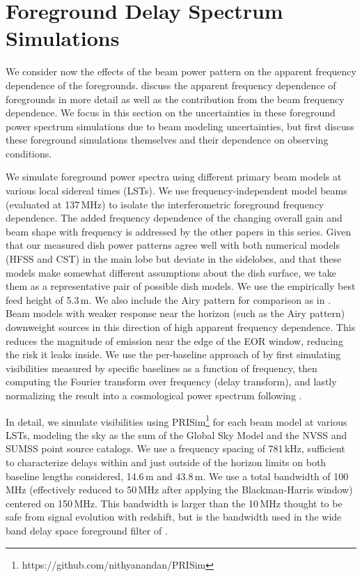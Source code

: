 \documentclass{emulateapj}
\begin{document}
\section{Foreground Delay Spectrum Simulations}
\label{sec:foregrounds}

We consider now the effects of the beam power pattern on the apparent frequency dependence of the foregrounds. \citet{nithya16} discuss the apparent frequency dependence of foregrounds in more detail as well as the contribution from the beam frequency dependence. We focus in this section on the uncertainties in these foreground power spectrum simulations due to beam modeling uncertainties, but first discuss these foreground simulations themselves and their dependence on observing conditions. 

We simulate foreground power spectra using different primary beam models at various local sidereal times (LSTs). We use frequency-independent model beams (evaluated at 137\,MHz) to isolate the interferometric foreground frequency dependence. The added frequency dependence of the changing overall gain and beam shape with frequency is addressed by the other papers in this series. Given that our measured dish power patterns agree well with both numerical models (HFSS and CST) in the main lobe but deviate in the sidelobes, and that these models make somewhat different assumptions about the dish surface, we take them as a representative pair of possible dish models. We use the empirically best feed height of 5.3\,m. We also include the Airy pattern for comparison as in \citet{nithya15}. Beam models with weaker response near the horizon (such as the Airy pattern) downweight sources in this direction of high apparent frequency dependence. This reduces the magnitude of emission near the edge of the EOR window, reducing the risk it leaks inside. We use the per-baseline approach of \citet{parsons12a,parsons12b} by first simulating visibilities measured by specific baselines as a function of frequency, then computing the Fourier transform over frequency (delay transform), and lastly normalizing the result into a cosmological power spectrum following \citet{nithya15}. 

In detail, we simulate visibilities using PRISim\footnote{https://github.com/nithyanandan/PRISim} for each beam model at various LSTs, modeling the sky as the sum of the Global Sky Model \citep{gsm} and the NVSS \citep{nvss} and SUMSS \citep{sumss,sumss2} point source catalogs. We use a frequency spacing of 781\,kHz, sufficient to characterize delays within and just outside of the horizon limits on both baseline lengths considered, 14.6\,m and 43.8\,m. We use a total bandwidth of 100\,MHz (effectively reduced to 50\,MHz after applying the Blackman-Harris window) centered on 150\,MHz. This bandwidth is larger than the 10\,MHz thought to be safe from signal evolution with redshift, but is the bandwidth used in the wide band delay space foreground filter of \citet{paper32,ali2015}.
\end{document}
